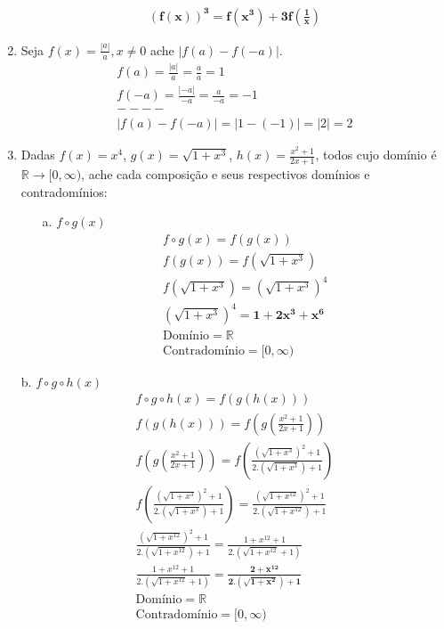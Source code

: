 \documentclass{article}
\begin{document}
\begin{enumerate}
\begin{gather*}
            \mathbf{(f(x))^{3} = f(x^{3})+3f\left(\frac{1}{x}\right)}
        \end{gather*}
    \item Seja $f(x) = \frac{|a|}{a}, x \neq 0$ ache $|f(a)-f(-a)|$.
        \begin{gather*}
            f(a) = \frac{|a|}{a} = \frac{a}{a} = 1 \\
            f(-a) = \frac{|-a|}{-a} = \frac{a}{-a} = -1 \\
            ----\\
            |f(a)-f(-a)| = |1-(-1)| = |2| = 2
        \end{gather*}
    \item Dadas $f(x) = x^{4}$, $g(x) = \sqrt{1+x^{3}}$, $h(x) = \frac{x^{2}+1}{2x+1}$, todos cujo domínio é $\mathbb{R} \to [0, \infty) $, ache cada composição e seus respectivos domínios e contradomínios:
        \begin{enumerate}
        \item[a.] $f \circ g(x)$
            \begin{gather*}
                f \circ g(x) = f(g(x)) \\
                f(g(x)) = f(\sqrt{1+x^{3}}) \\
                f(\sqrt{1+x^{3}}) = (\sqrt{1+x^{3}})^{4} \\
                (\sqrt{1+x^{3}})^{4} = \mathbf{1+2x^{3}+x^{6}} \\
                \text{Domínio} = \mathbb{R} \\
                \text{Contradomínio} = [0, \infty)
            \end{gather*}
        \end{enumerate}
        \item[b.] $f \circ g \circ h(x)$
            \begin{gather*}
                f \circ g \circ h(x) = f(g(h(x))) \\
                f(g(h(x))) = f\left(g\left(\frac{x^{2}+1}{2x+1}\right)\right) \\
                f\left(g\left(\frac{x^{2}+1}{2x+1}\right)\right) = f\left(\frac{(\sqrt{1+x^{3}})^{2}+1}{2.(\sqrt{1+x^{3}})+1}\right) \\
                f\left(\frac{(\sqrt{1+x^{3}})^{2}+1}{2.(\sqrt{1+x^{3}})+1}\right) = \frac{(\sqrt{1+x^{12}})^{2}+1}{2.(\sqrt{1+x^{12}})+1} \\
                \frac{(\sqrt{1+x^{12}})^{2}+1}{2.(\sqrt{1+x^{12}})+1} = \frac{1+x^{12}+1}{2.(\sqrt{1+x^{12}}+1)} \\
                \frac{1+x^{12}+1}{2.(\sqrt{1+x^{12}}+1)} = \mathbf{\frac{2+x^{12}}{2.(\sqrt{1+x^{2}})+1}} \\
                \text{Domínio} = \mathbb{R} \\
                \text{Contradomínio} = [0, \infty)
            \end{gather*}
\end{enumerate}
\end{document}
